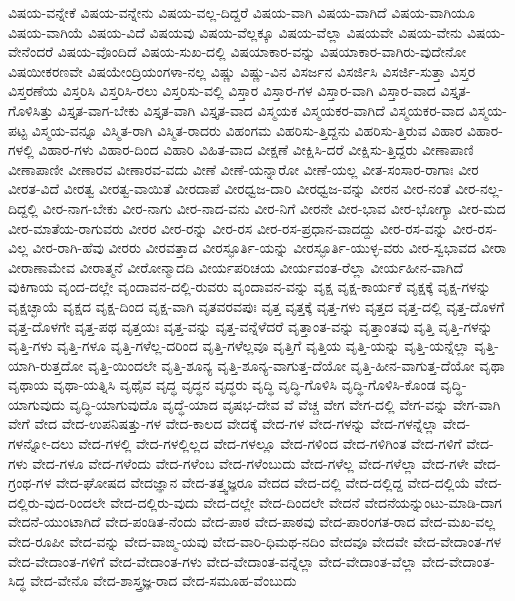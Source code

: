 {ವಿಷಯ-ವನ್ನೇಕೆ
ವಿಷಯ-ವನ್ನೇನು
ವಿಷಯ-ವಲ್ಲ-ದಿದ್ದರೆ
ವಿಷಯ-ವಾಗಿ
ವಿಷಯ-ವಾಗಿದೆ
ವಿಷಯ-ವಾಗಿಯೂ
ವಿಷಯ-ವಾಗಿಯೆ
ವಿಷಯ-ವಿದೆ
ವಿಷಯವು
ವಿಷಯ-ವೆಲ್ಲಕ್ಕೂ
ವಿಷಯ-ವೆಲ್ಲಾ
ವಿಷಯವೇ
ವಿಷಯ-ವೇನು
ವಿಷಯ-ವೇನೆಂದರೆ
ವಿಷಯ-ವೊಂದಿದೆ
ವಿಷಯ-ಸುಖ-ದಲ್ಲಿ
ವಿಷಯಾಕಾರ-ವನ್ನು
ವಿಷಯಾಕಾರ-ವಾಗಿರು-ವುದೇನೋ
ವಿಷಯೀಕರಣವೇ
ವಿಷಯೇಂದ್ರಿಯಂಗಳಾ-ನಲ್ಲ
ವಿಷ್ಣು
ವಿಷ್ಣು-ವಿನ
ವಿಸರ್ಜನ
ವಿಸರ್ಜಿಸಿ
ವಿಸರ್ಜಿ-ಸುತ್ತಾ
ವಿಸ್ತರ
ವಿಸ್ತರಣೆಯ
ವಿಸ್ತರಿಸಿ
ವಿಸ್ತರಿಸಿ-ರಲು
ವಿಸ್ತರಿಸು-ವಲ್ಲಿ
ವಿಸ್ತಾರ
ವಿಸ್ತಾರ-ಗಳ
ವಿಸ್ತಾರ-ವಾಗಿ
ವಿಸ್ತಾರ-ವಾದ
ವಿಸ್ತೃತ-ಗೊಳಿಸಿತ್ತು
ವಿಸ್ತೃತ-ವಾಗ-ಬೇಕು
ವಿಸ್ತೃತ-ವಾಗಿ
ವಿಸ್ತೃತ-ವಾದ
ವಿಸ್ಮಯಕ
ವಿಸ್ಮಯಕರ-ವಾಗಿದೆ
ವಿಸ್ಮಯಕರ-ವಾದ
ವಿಸ್ಮಯ-ಪಟ್ಟ
ವಿಸ್ಮಯ-ವನ್ನೂ
ವಿಸ್ಮಿತ-ರಾಗಿ
ವಿಸ್ಮಿತ-ರಾದರು
ವಿಹಂಗಮ
ವಿಹರಿಸು-ತ್ತಿದ್ದನು
ವಿಹರಿಸು-ತ್ತಿರುವ
ವಿಹಾರ
ವಿಹಾರ-ಗಳಲ್ಲಿ
ವಿಹಾರ-ಗಳು
ವಿಹಾರ-ದಿಂದ
ವಿಹಾರಿ
ವಿಹಿತ-ವಾದ
ವೀಕ್ಷಣೆ
ವೀಕ್ಷಿಸಿ-ದರೆ
ವೀಕ್ಷಿಸು-ತ್ತಿದ್ದರು
ವೀಣಾಪಾಣಿ
ವೀಣಾಪಾಣೀ
ವೀಣಾರವ
ವೀಣಾರವ-ವದು
ವೀಣೆ
ವೀಣೆ-ಯನ್ನಾರೋ
ವೀಣೆ-ಯಲ್ಲ
ವೀತ-ಸಂಸಾರ-ರಾಗಾಃ
ವೀರ
ವೀರತ-ವಿದೆ
ವೀರತ್ವ
ವೀರತ್ವ-ವಾಯಿತೆ
ವೀರದಾಪೆ
ವೀರಧ್ವಜ-ದಾರಿ
ವೀರಧ್ವಜ-ವನ್ನು
ವೀರನ
ವೀರ-ನಂತೆ
ವೀರ-ನಲ್ಲ-ದಿದ್ದಲ್ಲಿ
ವೀರ-ನಾಗ-ಬೇಕು
ವೀರ-ನಾಗು
ವೀರ-ನಾದ-ವನು
ವೀರ-ನಿಗೆ
ವೀರನೇ
ವೀರ-ಭಾವ
ವೀರ-ಭೋಗ್ಯಾ
ವೀರ-ಮದ
ವೀರ-ಮಾತೆಯ-ರಾಗುವರು
ವೀರರ
ವೀರ-ರನ್ನು
ವೀರ-ರಸ
ವೀರ-ರಸ-ಪ್ರಧಾನ-ವಾದದ್ದು
ವೀರ-ರಸ-ವನ್ನು
ವೀರ-ರಸ-ವಿಲ್ಲ
ವೀರ-ರಾಗಿ-ಹೆವು
ವೀರರು
ವೀರವತ್ತಾದ
ವೀರಸ್ಫೂರ್ತಿ-ಯನ್ನು
ವೀರಸ್ಫೂರ್ತಿ-ಯುಳ್ಳ-ವರು
ವೀರ-ಸ್ವಭಾವದ
ವೀರಾ
ವೀರಾಣಾಮೇವ
ವೀರಾತ್ಮನೆ
ವೀರೋನ್ಮಾದದಿ
ವೀರ್ಯಪರಿಚಯ
ವೀರ್ಯವಂತ-ರೆಲ್ಲಾ
ವೀರ್ಯಹೀನ-ವಾಗಿದೆ
ವುಕಿಗಾಯ
ವೃಂದ-ದಲ್ಲೇ
ವೃಂದಾವನ-ದಲ್ಲಿ-ರುವರು
ವೃಂದಾವನ-ವನ್ನು
ವೃಕ್ಷ
ವೃಕ್ಷ-ಕಾರ್ಯಕೆ
ವೃಕ್ಷಕ್ಕೆ
ವೃಕ್ಷ-ಗಳನ್ನು
ವೃಕ್ಷಚ್ಛಾಯೆ
ವೃಕ್ಷದ
ವೃಕ್ಷ-ದಿಂದ
ವೃಕ್ಷ-ವಾಗಿ
ವೃತವರವಪುಃ
ವೃತ್ತ
ವೃತ್ತಕ್ಕೆ
ವೃತ್ತ-ಗಳು
ವೃತ್ತದ
ವೃತ್ತ-ದಲ್ಲಿ
ವೃತ್ತ-ದೊಳಗೆ
ವೃತ್ತ-ದೊಳಗೇ
ವೃತ್ತ-ಪಥ
ವೃತ್ತಯಃ
ವೃತ್ತ-ವನ್ನು
ವೃತ್ತ-ವನ್ನೆಳೆದರೆ
ವೃತ್ತಾಂತ-ವನ್ನು
ವೃತ್ತಾಂತವು
ವೃತ್ತಿ
ವೃತ್ತಿ-ಗಳನ್ನು
ವೃತ್ತಿ-ಗಳು
ವೃತ್ತಿ-ಗಳೂ
ವೃತ್ತಿ-ಗಳೆಲ್ಲ-ದರಿಂದ
ವೃತ್ತಿ-ಗಳೆಲ್ಲವೂ
ವೃತ್ತಿಗೆ
ವೃತ್ತಿಯ
ವೃತ್ತಿ-ಯನ್ನು
ವೃತ್ತಿ-ಯನ್ನೆಲ್ಲಾ
ವೃತ್ತಿ-ಯಾಗಿ-ರುತ್ತದೋ
ವೃತ್ತಿ-ಯಿಂದಲೇ
ವೃತ್ತಿ-ಶೂನ್ಯ
ವೃತ್ತಿ-ಶೂನ್ಯ-ವಾಗುತ್ತ-ದೆಯೋ
ವೃತ್ತಿ-ಹೀನ-ವಾಗುತ್ತ-ದೆಯೋ
ವೃಥಾ
ವೃಥಾಯ
ವೃಥಾ-ಯತ್ನಿಸಿ
ವೃಥೈವ
ವೃದ್ಧ
ವೃದ್ಧನ
ವೃದ್ಧರು
ವೃದ್ಧಿ
ವೃದ್ಧಿ-ಗೊಳಿಸಿ
ವೃದ್ಧಿ-ಗೊಳಿಸಿ-ಕೊಂಡ
ವೃದ್ಧಿ-ಯಾಗುವುದು
ವೃದ್ಧಿ-ಯಾಗುವುದೊ
ವೃದ್ಧೆ-ಯಾದ
ವೃಷಭ-ದೇವ
ವೆ
ವೆಚ್ಚ
ವೇಗ
ವೇಗ-ದಲ್ಲಿ
ವೇಗ-ವನ್ನು
ವೇಗ-ವಾಗಿ
ವೇಗೆ
ವೇದ
ವೇದ-ಉಪನಿಷತ್ತು-ಗಳ
ವೇದ-ಕಾಲದ
ವೇದಕ್ಕೆ
ವೇದ-ಗಳ
ವೇದ-ಗಳನ್ನು
ವೇದ-ಗಳನ್ನೆಲ್ಲಾ
ವೇದ-ಗಳನ್ನೋ-ದಲು
ವೇದ-ಗಳಲ್ಲಿ
ವೇದ-ಗಳಲ್ಲಿಲ್ಲದ
ವೇದ-ಗಳಲ್ಲೂ
ವೇದ-ಗಳಿಂದ
ವೇದ-ಗಳಿಗಿಂತ
ವೇದ-ಗಳಿಗೆ
ವೇದ-ಗಳು
ವೇದ-ಗಳೂ
ವೇದ-ಗಳೆಂದು
ವೇದ-ಗಳೆಂಬ
ವೇದ-ಗಳೆಂಬುದು
ವೇದ-ಗಳೆಲ್ಲ
ವೇದ-ಗಳೆಲ್ಲಾ
ವೇದ-ಗಳೇ
ವೇದ-ಗ್ರಂಥ-ಗಳ
ವೇದ-ಘೋಷದ
ವೇದಜ್ಞಾನ
ವೇದ-ತತ್ತ್ವಜ್ಞರೂ
ವೇದದ
ವೇದ-ದಲ್ಲಿ
ವೇದ-ದಲ್ಲಿದ್ದ
ವೇದ-ದಲ್ಲಿಯೆ
ವೇದ-ದಲ್ಲಿರು-ವುದ-ರಿಂದಲೇ
ವೇದ-ದಲ್ಲಿರು-ವುದು
ವೇದ-ದಲ್ಲೇ
ವೇದ-ದಿಂದಲೇ
ವೇದನೆ
ವೇದನೆಯನ್ನುಂಟು-ಮಾಡಿ-ದಾಗ
ವೇದನೆ-ಯುಂಟಾಗಿದೆ
ವೇದ-ಪಂಡಿತ-ನೆಂದು
ವೇದ-ಪಾಠ
ವೇದ-ಪಾಠವು
ವೇದ-ಪಾರಂಗತ-ರಾದ
ವೇದ-ಮಖ-ವಲ್ಲ
ವೇದ-ರೂಪೀ
ವೇದ-ವನ್ನು
ವೇದ-ವಾಙ್ಮ-ಯವು
ವೇದ-ವಾರಿ-ಧಿಮಥ-ನದಿಂ
ವೇದವೂ
ವೇದವೇ
ವೇದ-ವೇದಾಂತ-ಗಳ
ವೇದ-ವೇದಾಂತ-ಗಳಿಗೆ
ವೇದ-ವೇದಾಂತ-ಗಳು
ವೇದ-ವೇದಾಂತ-ವನ್ನೆಲ್ಲಾ
ವೇದ-ವೇದಾಂತ-ವೆಲ್ಲಾ
ವೇದ-ವೇದಾಂತ-ಸಿದ್ಧ
ವೇದ-ವೇನೊ
ವೇದ-ಶಾಸ್ತ್ರಜ್ಞ-ರಾದ
ವೇದ-ಸಮೂಹ-ವೆಂಬುದು
}
